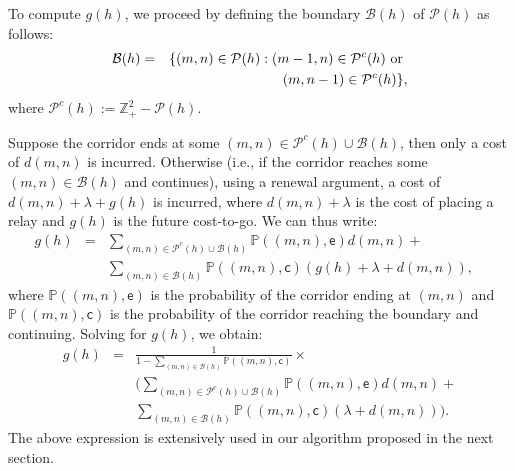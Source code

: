 \documentclass[conference]{IEEEtran}
\begin{document}
To compute $g(h)$, we proceed by defining the boundary $\mathcal{B}(h)$ of $\mathcal{P}(h)$ as follows:
\begin{eqnarray}
\mathcal{B}(h)&=&\{(m,n)\in \mathcal{P}(h): (m-1,n)\in\mathcal{P}^c(h) \mbox{ or } \nonumber\\
&&\hspace{4mm}(m,n-1) \in \mathcal{P}^c(h) \},
\end{eqnarray}
where $\mathcal{P}^c(h):=\mathbb{Z}_+^2-\mathcal{P}(h)$.

Suppose the corridor ends at some $(m,n)\in \mathcal{P}^c(h)\cup \mathcal{B}(h)$, then only a cost of 
$d(m,n)$ is incurred. Otherwise (i.e., if the corridor reaches some $(m,n)\in \mathcal{B}(h)$ and 
continues), using a renewal argument, a cost of $d(m,n)+\lambda+g(h)$ is incurred, where 
$d(m,n)+\lambda$ is the cost of placing a relay and $g(h)$ is the future cost-to-go. We can thus write:
\begin{eqnarray} 
g(h)&=&\sum_{(m,n)\in \mathcal{P}^c(h)\cup \mathcal{B}(h)}\mathbb{P}((m,n),
\mathsf{e})d(m,n)+\nonumber \\
&&\sum_{(m,n)\in \mathcal{B}(h)}\!\mathbb{P}((m,n),\mathsf{c})(g(h)\!+\!\lambda\!+\!d(m,n)),\;\;\;
\end{eqnarray}
where $\mathbb{P}((m,n),\mathsf{e})$ is the probability of the corridor ending at $(m,n)$ and 
$\mathbb{P}((m,n),\mathsf{c})$ is the probability of the corridor reaching the boundary and continuing. 
Solving for $g(h)$, we obtain:
\begin{eqnarray} \label{NLOS_gh}
\label{Boundary}
g(h)&=&\frac{1}{1-\sum_{(m,n)\in \mathcal{B}(h)}
\mathbb{P}((m,n),\mathsf{c})}\times \nonumber\\
&&\Bigg(\sum_{(m,n)\in \mathcal{P}^c(h)\cup \mathcal{B}(h)}\mathbb{P}((m,n),
\mathsf{e})d(m,n)+\nonumber  \\
&&\sum_{(m,n)\in \mathcal{B}(h)}\mathbb{P}((m,n),\mathsf{c})(\lambda+d(m,n))\Bigg).
\end{eqnarray} 
The above expression is extensively used in our algorithm proposed in the next section.
\end{document}

